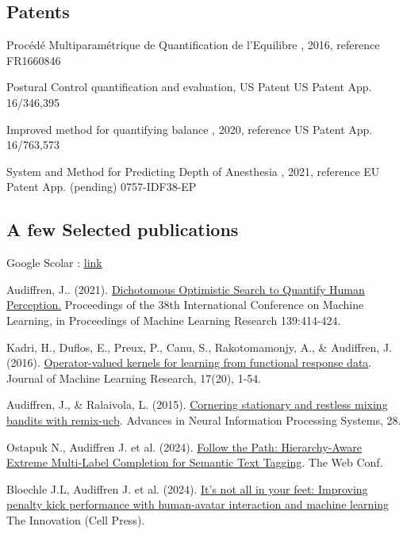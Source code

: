 


\hspace{1em}

\subsection{Patents}
\begin{zitemize}
\item{Procédé Multiparamétrique de Quantification de l’Equilibre , 2016, reference FR1660846}
\item{Postural Control quantification and evaluation, US Patent US Patent App. 16/346,395 }
\item{Improved method for quantifying balance , 2020, reference US Patent App. 16/763,573}
\item{System and Method for Predicting Depth of Anesthesia , 2021, reference EU Patent App.
(pending) 0757-IDF38-EP}
\end{zitemize}

\subsection{A few Selected publications}
Google Scolar : \href{https://scholar.google.com/citations?user=7jcEx7cAAAAJ&hl=en}{link}

\begin{zitemize}
    \item Audiffren, J.. (2021).  \href{https://proceedings.mlr.press/v139/audiffren21a.html.}{Dichotomous Optimistic Search to Quantify Human Perception.} Proceedings of the 38th International Conference on Machine Learning, in Proceedings of Machine Learning Research 139:414-424.
    \item Kadri, H., Duflos, E., Preux, P., Canu, S., Rakotomamonjy, A., \& Audiffren, J. (2016). \href{https://www.jmlr.org/papers/volume17/11-315/11-315.pdf}{Operator-valued kernels for learning from functional response data}. Journal of Machine Learning Research, 17(20), 1-54.
    \item Audiffren, J., \& Ralaivola, L. (2015). \href{https://proceedings.neurips.cc/paper/2015/file/4888241374e8c62ddd9b4c3cfd091f96-Paper.pdf}{Cornering stationary and restless mixing bandits with remix-ucb}. Advances in Neural Information Processing Systems, 28.
    \item Ostapuk N., Audiffren J. et al. (2024). \href{https://dl.acm.org/doi/pdf/10.1145/3589334.3645558}{Follow the Path: Hierarchy-Aware Extreme Multi-Label Completion for Semantic Text Tagging}. The Web Conf.
    \item Bloechle J.L, Audiffren J. et al. (2024).
    \href{https://www.sciencedirect.com/science/article/pii/S2666675824000225}{It’s not all in your feet: Improving penalty kick performance with human-avatar interaction and machine learning} The Innovation (Cell Press).
\end{zitemize}







